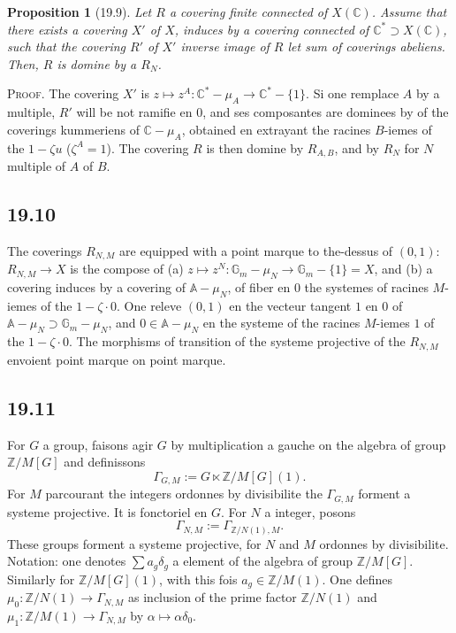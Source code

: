 \documentclass[12pt,a4paper]{article}
\theoremstyle{plain}
\newtheorem{proposition}[theorem]{Proposition}
\theoremstyle{definition}
\theoremstyle{remark}
\newcommand{\Gm}{\mathbb{G}_m}
\newcommand{\ZZ}{\mathbb{Z}}
\newcommand{\CC}{\mathbb{C}}
\newcommand{\GA}{\mathbb{A}}
\begin{document}
\begin{proposition}[19.9]\label{prop:19.9}
Let $R$ a covering finite connected of $X(\CC)$. Assume that there exists a covering $X'$ of $X$, induces by a covering connected of
$\CC^* \supset X(\CC)$, such that the covering $R'$ of $X'$ inverse image of $R$ let sum of coverings abeliens. Then, $R$ is
domine by a $R_N$.
\end{proposition}

\noindent \textsc{Proof.} The covering $X'$ is $z \mapsto z^A :
\CC^* - \mu_A \to \CC^* - \{1\}$. Si one remplace $A$ by a
multiple, $R'$ will be not ramifie en $0$, and ses composantes are
dominees by of the coverings kummeriens of $\CC - \mu_A$, obtained en
extrayant the racines $B$-iemes of the $1 - \zeta u$ ($\zeta^A = 1$).
The covering $R$ is then domine by $R_{A,B}$, and by $R_N$ for
$N$ multiple of $A$ of $B$.

\subsection{19.10}

The coverings $R_{N,M}$ are equipped with a point marque to the-dessus of
$(0,1)$: $R_{N,M} \to X$ is the compose of (a) $z \mapsto z^N : \Gm -
\mu_N \to \Gm - \{1\} = X$, and (b) a covering induces by a
covering of $\GA - \mu_N$, of fiber en $0$ the systemes of racines
$M$-iemes of the $1 - \zeta \cdot 0$. One releve $(0,1)$ en the vecteur
tangent $1$ en $0$ of $\GA - \mu_N \supset \Gm - \mu_N$, and
$0 \in \GA - \mu_N$ en the systeme of the racines $M$-iemes $1$ of the
$1 - \zeta \cdot 0$. The morphisms of transition of the systeme projective
of the $R_{N,M}$ envoient point marque on point marque.

\subsection{19.11}

For $G$ a group, faisons agir $G$ by multiplication a gauche on
the algebra of group $\ZZ/M[G]$ and definissons
\[
\Gamma_{G,M} := G \ltimes \ZZ/M[G](1).
\]
For $M$ parcourant the integers ordonnes by divisibilite the
$\Gamma_{G,M}$ forment a systeme projective. It is fonctoriel en
$G$. For $N$ a integer, posons
\[
\Gamma_{N,M} := \Gamma_{\ZZ/N(1),M}.
\]
These groups forment a systeme projective, for $N$ and $M$ ordonnes
by divisibilite. Notation: one denotes $\sum a_g \delta_g$ a element of
the algebra of group $\ZZ/M[G]$. Similarly for $\ZZ/M[G](1)$, with
this fois $a_g \in \ZZ/M(1)$. One defines $\mu_0 : \ZZ/N(1) \to
\Gamma_{N,M}$ as inclusion of the prime factor $\ZZ/N(1)$ and
$\mu_1 : \ZZ/M(1) \to \Gamma_{N,M}$ by $\alpha \mapsto \alpha \delta_0$.
\end{document}
